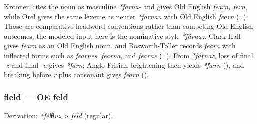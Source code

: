 \documentclass[
  british,
  a4paper,
]{article}
\begin{document}
Kroonen cites the noun as masculine \emph{*farna-} and gives Old English
\emph{fearn, fern}, while Orel gives the same lexeme as neuter
\emph{*farnan} with Old English \emph{fearn}
(;
). Those are comparative headword
conventions rather than competing Old English outcomes; the modeled
input here is the nominative-style \emph{*fárnaz}. Clark Hall gives
\emph{fearn} as an Old English noun, and Bosworth-Toller records
\emph{fearn} with inflected forms such as \emph{fearnes}, \emph{fearna},
and \emph{fearne} (;
). From
\emph{*fárnaz}, loss of final \emph{-z} and final \emph{-a} gives
\emph{*fárn}; Anglo-Frisian brightening then yields \emph{*færn}
(), and breaking before
\emph{r} plus consonant gives \emph{fearn}
().

\subsubsection{field --- OE feld}\label{field-oe-feld}

Derivation: \emph{*félθuz} \textgreater{} \emph{feld} (regular).

\begingroup
\setlength{\fboxsep}{6pt}
\end{document}
